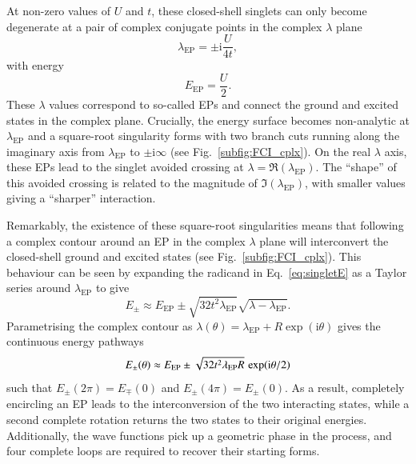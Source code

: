 \documentclass[aps,prb,reprint,noshowkeys,linenumbers,superscriptaddress]{revtex4-1}
\renewcommand{\i}{\mathrm{i}} %
\begin{document}
At non-zero values of $U$ and $t$, these closed-shell singlets can only become degenerate at a pair of complex conjugate points in the complex $\lambda$ plane 
\begin{equation}
\lambda_{\text{EP}} = \pm  \i \frac{U}{4t},
\end{equation}
with energy
\begin{equation}
\label{eq:E_EP}
	E_\text{EP} = \frac{U}{2}.
\end{equation}
These $\lambda$ values correspond to so-called EPs and connect the ground and excited states in the complex plane.
Crucially, the energy surface becomes non-analytic at $\lambda_{\text{EP}}$ and a square-root singularity forms with two branch cuts running along the imaginary axis from $\lambda_{\text{EP}}$  to $\pm \i \infty$ (see Fig.~\ref{subfig:FCI_cplx}).
On the real $\lambda$ axis, these EPs lead to the singlet avoided crossing at $\lambda = \Re(\lambda_{\text{EP}})$.
The ``shape'' of this avoided crossing is related to the magnitude of $\Im(\lambda_{\text{EP}})$, with smaller values giving a ``sharper'' interaction.

Remarkably, the existence of these square-root singularities means that following a complex contour around an EP in the complex $\lambda$ plane will interconvert the closed-shell ground and excited states (see Fig.~\ref{subfig:FCI_cplx}).
This behaviour can be seen by expanding the radicand in Eq.~\eqref{eq:singletE} as a Taylor series around $\lambda_{\text{EP}}$ to give
\begin{equation}
E_{\pm} \approx E_{\text{EP}} \pm \sqrt{32t^2 \lambda_{\text{EP}}} \sqrt{\lambda - \lambda_{\text{EP}}}.
\end{equation}
Parametrising the complex contour as $\lambda(\theta) = \lambda_{\text{EP}} + R \exp(\i \theta)$ gives the continuous energy pathways 
\begin{equation}
E_{\pm} \qty(\theta) \approx E_{\text{EP}} \pm \sqrt{32t^2 \lambda_{\text{EP}} R}\, \exp(\i \theta/2)
\end{equation}
such that $E_{\pm}(2\pi)  = E_{\mp}(0)$ and $E_{\pm}(4\pi)  = E_{\pm}(0)$.
As a result, completely encircling an EP leads to the interconversion of the two interacting states, while a second complete rotation returns the two states to their original energies.
Additionally, the wave functions pick up a geometric phase in the process, and four complete loops are required to recover their starting forms.\cite{MoiseyevBook}
\end{document}
